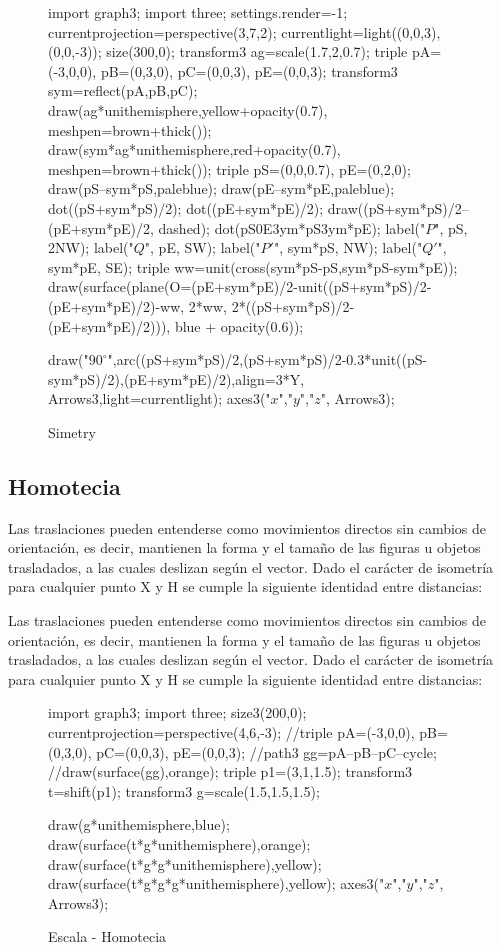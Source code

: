 \begin{figure}[!ht]
	\centering
	\begin{asy}
	import graph3;
	import three;
	settings.render=-1;
	currentprojection=perspective(3,7,2);
	currentlight=light((0,0,3),(0,0,-3));
	size(300,0);
	transform3 ag=scale(1.7,2,0.7);
	triple pA=(-3,0,0), pB=(0,3,0), pC=(0,0,3), pE=(0,0,3);
	transform3 sym=reflect(pA,pB,pC);
	draw(ag*unithemisphere,yellow+opacity(0.7), meshpen=brown+thick());
	draw(sym*ag*unithemisphere,red+opacity(0.7), meshpen=brown+thick());
	triple pS=(0,0,0.7), pE=(0,2,0);
	draw(pS--sym*pS,paleblue);
	draw(pE--sym*pE,paleblue);
	dot((pS+sym*pS)/2);
	dot((pE+sym*pE)/2);
	draw((pS+sym*pS)/2--(pE+sym*pE)/2, dashed);
	dot(pS^^pE^^sym*pS^^sym*pE);
	label("$P$", pS, 2NW);
	label("$Q$", pE, SW);
	label("$P'$", sym*pS, NW);
	label("$Q'$", sym*pE, SE);
	triple ww=unit(cross(sym*pS-pS,sym*pS-sym*pE));
	draw(surface(plane(O=(pE+sym*pE)/2-unit((pS+sym*pS)/2-(pE+sym*pE)/2)-ww, 2*ww, 2*((pS+sym*pS)/2-(pE+sym*pE)/2))), blue + opacity(0.6));

	draw("$90^\circ$",arc((pS+sym*pS)/2,(pS+sym*pS)/2-0.3*unit((pS-sym*pS)/2),(pE+sym*pE)/2),align=3*Y,  Arrows3,light=currentlight);
	axes3("$x$","$y$","$z$", Arrows3);

	\end{asy}
	\caption{Simetry}
\end{figure}
\subsection{Homotecia}
Las traslaciones pueden entenderse como movimientos directos sin cambios de orientación, es decir, mantienen la forma y el tamaño de las figuras u objetos trasladados, a las cuales deslizan según el vector. Dado el carácter de isometría para cualquier punto X y H se cumple la siguiente identidad entre distancias:

Las traslaciones pueden entenderse como movimientos directos sin cambios de orientación, es decir, mantienen la forma y el tamaño de las figuras u objetos trasladados, a las cuales deslizan según el vector. Dado el carácter de isometría para cualquier punto X y H se cumple la siguiente identidad entre distancias:


\begin{figure}[!ht]
	\centering
	\begin{asy}
	import graph3;
	import three;
	size3(200,0);
	currentprojection=perspective(4,6,-3);
	//triple pA=(-3,0,0), pB=(0,3,0), pC=(0,0,3), pE=(0,0,3);
	//path3 gg=pA--pB--pC--cycle;
	//draw(surface(gg),orange);
	triple p1=(3,1,1.5);
	transform3 t=shift(p1);
	transform3 g=scale(1.5,1.5,1.5);

	draw(g*unithemisphere,blue);
	draw(surface(t*g*unithemisphere),orange);
	draw(surface(t*g*g*unithemisphere),yellow);
	draw(surface(t*g*g*g*unithemisphere),yellow);
	axes3("$x$","$y$","$z$", Arrows3);
	\end{asy}
	\caption{Escala - Homotecia}
\end{figure}



